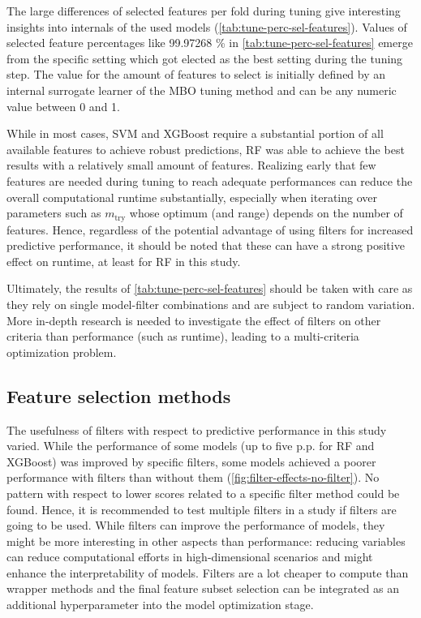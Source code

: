 \documentclass[final]{IEEEtran}
\begin{document}
The large differences of selected features per fold during tuning give interesting insights into internals of the used models (\autoref{tab:tune-perc-sel-features}).
Values of selected feature percentages like 99.97268 \% in \autoref{tab:tune-perc-sel-features} emerge from the specific setting which got elected as the best setting during the tuning step.
The value for the amount of features to select is initially defined by an internal surrogate learner of the MBO tuning method and can be any numeric value between 0 and 1.

While in most cases, SVM and XGBoost require a substantial portion of all available features to achieve robust predictions, RF was able to achieve the best results with a relatively small amount of features.
Realizing early that few features are needed during tuning to reach adequate performances can reduce the overall computational runtime substantially, especially when iterating over parameters such as $m_\textrm{try}$ whose optimum (and range) depends on the number of features.
Hence, regardless of the potential advantage of using filters for increased predictive performance, it should be noted that these can have a strong positive effect on runtime, at least for RF in this study.

Ultimately, the results of \autoref{tab:tune-perc-sel-features} should be taken with care as they rely on single model-filter combinations and are subject to random variation.
More in-depth research is needed to investigate the effect of filters on other criteria than performance (such as runtime), leading to a multi-criteria optimization problem.

\subsection{Feature selection methods}

The usefulness of filters with respect to predictive performance in this study varied.
While the performance of some models (up to five p.p. for RF and XGBoost) was improved by specific filters, some models achieved a poorer performance with filters than without them (\autoref{fig:filter-effects-no-filter}).
No pattern with respect to lower scores related to a specific filter method could be found.
Hence, it is recommended to test multiple filters in a study if filters are going to be used.
While filters can improve the performance of models, they might be more interesting in other aspects than performance: reducing variables can reduce computational efforts in high-dimensional scenarios and might enhance the interpretability of models.
Filters are a lot cheaper to compute than wrapper methods and the final feature subset selection can be integrated as an additional hyperparameter into the model optimization stage.
\end{document}
